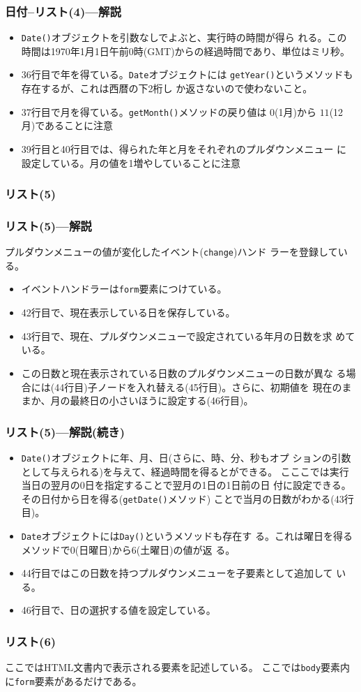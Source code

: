\begin{frame}[containsverbatim]
\frametitle{日付--リスト(4)---解説}
\begin{itemize}
 \item \texttt{Date()}オブジェクトを引数なしでよぶと、実行時の時間が得ら
       れる。この時間は1970年1月1日午前0時(GMT)からの経過時間であり、単位はミリ秒。
 \item 36行目で年を得ている。\texttt{Date}オブジェクトには
       \texttt{getYear()}というメソッドも存在するが、これは西暦の下2桁し
       か返さないので使わないこと。
 \item 37行目で月を得ている。\texttt{getMonth()}メソッドの戻り値は
       $0$(1月)から $11$(12月)であることに注意
 \item 39行目と40行目では、得られた年と月をそれぞれのプルダウンメニュー
       に設定している。月の値を1増やしていることに注意
\end{itemize}
\end{frame}
\begin{frame}[containsverbatim]
\frametitle{リスト(5)}
\end{frame}
\begin{frame}[containsverbatim]
\frametitle{リスト(5)---解説}
プルダウンメニューの値が変化したイベント(\texttt{change})ハンド
 ラーを登録している。
\begin{itemize}
 \item イベントハンドラーは\texttt{form}要素につけている。
 \item 42行目で、現在表示している日を保存している。
 \item 43行目で、現在、プルダウンメニューで設定されている年月の日数を求
       めている。
 \item この日数と現在表示されている日数のプルダウンメニューの日数が異な
       る場合には(44行目)子ノードを入れ替える(45行目)。さらに、初期値を
       現在のままか、月の最終日の小さいほうに設定する(46行目)。
\end{itemize}
\end{frame}
\begin{frame}[containsverbatim]
\frametitle{リスト(5)---解説(続き)}
\begin{itemize}
 \item \texttt{Date()}オブジェクトに年、月、日(さらに、時、分、秒もオプ
       ションの引数として与えられる)を与えて、経過時間を得るとができる。
       こここでは実行当日の翌月の0日を指定することで翌月の1日の1日前の日
       付に設定できる。その日付から日を得る(\texttt{getDate()}メソッド)
       ことで当月の日数がわかる(43行目)。
 \item \texttt{Date}オブジェクトには\texttt{Day()}というメソッドも存在す
       る。これは曜日を得るメソッドで$0$(日曜日)から$6$(土曜日)の値が返
       る。
 \item 44行目ではこの日数を持つプルダウンメニューを子要素として追加して
       いる。
 \item 46行目で、日の選択する値を設定している。
\end{itemize}
\end{frame}
\begin{frame}[containsverbatim]
\frametitle{リスト(6)}
ここではHTML文書内で表示される要素を記述している。
ここでは\texttt{body}要素内に\texttt{form}要素があるだけである。
\end{frame}

